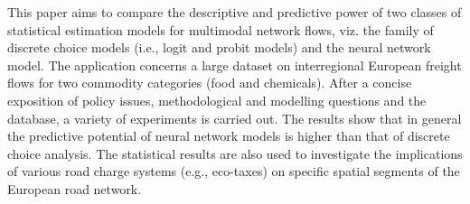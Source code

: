 This paper aims to compare the descriptive and predictive power of two classes of statistical estimation models for multimodal network flows, viz. the family of discrete choice models (i.e., logit and probit models) and the neural network model. The application concerns a large dataset on interregional European freight flows for two commodity categories (food and chemicals). After a concise exposition of policy issues, methodological and modelling questions and the database, a variety of experiments is carried out. The results show that in general the predictive potential of neural network models is higher than that of discrete choice analysis. The statistical results are also used to investigate the implications of various road charge systems (e.g., eco-taxes) on specific spatial segments of the European road network.